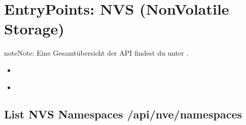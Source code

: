 \documentclass[letterpaper,10pt,english]{sphinxmanual}
\begin{document}
\sphinxstepscope


\chapter{Entry\sphinxhyphen{}Points: NVS (Non\sphinxhyphen{}Volatile Storage)}
\label{\detokenize{agv_rest_api_nve:entry-points-nvs-non-volatile-storage}}\label{\detokenize{agv_rest_api_nve::doc}}
\begin{sphinxadmonition}{note}{Note:}
\sphinxAtStartPar
Eine Gesamtübersicht der API findest du unter {\hyperref[\detokenize{index::doc}]{}}.
\end{sphinxadmonition}

\sphinxAtStartPar
{}
\begin{itemize}
\item {} 
\sphinxAtStartPar
{\hyperref[\detokenize{agv_rest_api_nve:get-api-nve-namespaces}]{}}

\item {} 
\sphinxAtStartPar
{\hyperref[\detokenize{agv_rest_api_nve:post-api-nve-listkeysandvalues}]{}}

\end{itemize}


\section{List NVS Namespaces \textendash{} /api/nve/namespaces}
\label{\detokenize{agv_rest_api_nve:list-nvs-namespaces-api-nve-namespaces}}\label{\detokenize{agv_rest_api_nve:get-api-nve-namespaces}}
\end{document}
